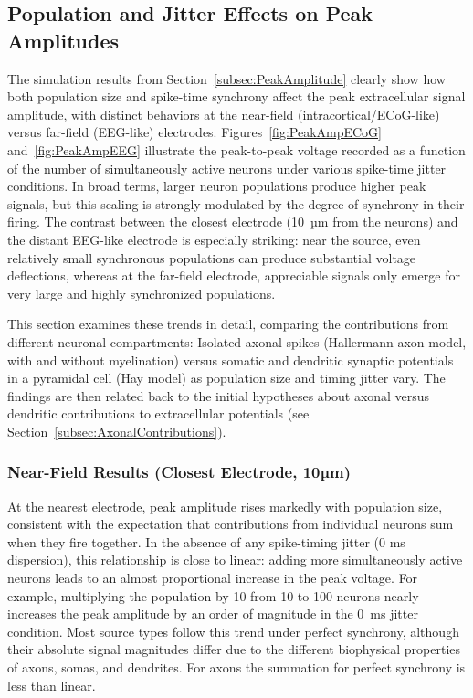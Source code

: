 \documentclass[final, a4paper,masters,en,listoffigures,listoftables,norwegiandates]{NMBU}
\begin{document}
\subsection{Population and Jitter Effects on Peak Amplitudes}
The simulation results from Section~\ref{subsec:PeakAmplitude} clearly show how both population size and spike-time synchrony affect the peak extracellular signal amplitude, with distinct behaviors at the near-field (intracortical/ECoG-like) versus far-field (EEG-like) electrodes. Figures~\ref{fig:PeakAmpECoG} and~\ref{fig:PeakAmpEEG} illustrate the peak-to-peak voltage recorded as a function of the number of simultaneously active neurons under various spike-time jitter conditions. In broad terms, larger neuron populations produce higher peak signals, but this scaling is strongly modulated by the degree of synchrony in their firing. The contrast between the closest electrode (10~µm from the neurons) and the distant EEG-like electrode is especially striking: near the source, even relatively small synchronous populations can produce substantial voltage deflections, whereas at the far-field electrode, appreciable signals only emerge for very large and highly synchronized populations.

This section examines these trends in detail, comparing the contributions from different neuronal compartments: Isolated axonal spikes (Hallermann axon model, with and without myelination) versus somatic and dendritic synaptic potentials in a pyramidal cell (Hay model) as population size and timing jitter vary. The findings are then related back to the initial hypotheses about axonal versus dendritic contributions to extracellular potentials (see Section~\ref{subsec:AxonalContributions}).

\subsubsection{Near-Field Results (Closest Electrode, 10µm)}
At the nearest electrode, peak amplitude rises markedly with population size, consistent with the expectation that contributions from individual neurons sum when they fire together. In the absence of any spike-timing jitter (0 ms dispersion), this relationship is close to linear: adding more simultaneously active neurons leads to an almost proportional increase in the peak voltage. For example, multiplying the population by 10 from 10 to 100 neurons nearly increases the peak amplitude by an order of magnitude in the 0~ms jitter condition. Most source types follow this trend under perfect synchrony, although their absolute signal magnitudes differ due to the different biophysical properties of axons, somas, and dendrites. For axons the summation for perfect synchrony is less than linear.
\end{document}
